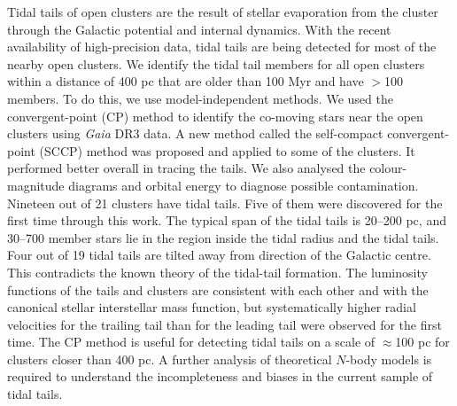 \documentclass{aa}
\begin{document}
      \abstract
       {
       Tidal tails of open clusters are the result of stellar evaporation from the cluster through the Galactic potential and internal dynamics. With the recent availability of high-precision data, tidal tails are being detected for most of the nearby open clusters.
       }
       {
       We identify the tidal tail members for all open clusters within a distance of 400 pc that are older than 100 Myr and have $>$100 members. To do this, we use model-independent methods. 
       }
       {
       We used the convergent-point (CP) method to identify the co-moving stars near the open clusters using \textit{Gaia} DR3 data. A new method called the self-compact convergent-point (SCCP) method was proposed and applied to some of the clusters. It performed better overall in tracing the tails. We also analysed the colour-magnitude diagrams and orbital energy to diagnose possible contamination.
       }
       {
       Nineteen out of 21 clusters have tidal tails. Five of them were discovered for the first time through this work. The typical span of the tidal tails is 20--200 pc, and 30--700 member stars lie in the region inside the tidal radius and the tidal tails. Four out of 19 tidal tails are tilted away from direction of the Galactic centre. This contradicts the known theory of the tidal-tail formation. The luminosity functions of the tails and clusters are consistent with each other and with the canonical stellar interstellar mass function, but systematically higher radial velocities for the trailing tail than for the leading tail were observed for the first time. 
       }
       {
       The CP method is useful for detecting tidal tails on a scale of $\approx$100 pc for clusters closer than 400 pc. A further analysis of theoretical $N$-body models is required to understand the incompleteness and biases in the current sample of tidal tails.
       }
    
    
       \maketitle
    
\end{document}
